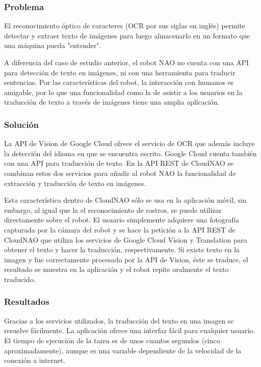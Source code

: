 \subsubsection{Problema}

El reconocimiento óptico de caracteres (OCR por sus siglas en inglés) permite detectar y extraer texto de imágenes para luego
almacenarlo en un formato que una máquina pueda "entender".

A diferencia del caso de estudio anterior, el robot NAO
no cuenta con una API para detección de
texto en imágenes, ni con una herramienta
para traducir sentencias. Por las características
del robot, la interacción con humanos es 
amigable, por lo que una funcionalidad como la de asistir
a los usuarios en la traducción de texto a través
de imágenes tiene una amplia aplicación.

\subsubsection{Solución}


La API de Vision de Google Cloud ofrece el servicio de OCR
que además incluye la detección del idioma en que se encuentra escrito.
Google Cloud cuenta también con una API para traducción de 
texto.
En la API REST de CloudNAO se combinan estos dos servicios
para añadir al robot NAO la funcionalidad de extracción y traducción de texto en imágenes. 

Esta característica dentro de CloudNAO sólo
se usa en la aplicación móvil, sin embargo, al igual que
la el reconocimiento de rostros, se puede utilizar directamente
sobre el robot. El usuario simplemente adquiere una fotografía
capturada por la cámara del robot y se hace la petición
a la API REST de CloudNAO que utiliza los servicios
de Google Cloud Vision y Translation para obtener el texto
y hacer la traducción, respectivamente.
Si existe texto en la imagen y fue correctamente procesado por
la API de Vision, éste se traduce, el resultado se muestra
en la aplicación y el robot repite oralmente
el texto traducido.

\subsubsection{Resultados}

Gracias a los servicios utilizados, la traducción 
del texto en una imagen se resuelve fácilmente.
La aplicación ofrece una interfaz fácil para cualquier
usuario. El tiempo de ejecución de la tarea
es de unos cuantos segundos (cinco aproximadamente), aunque es 
una variable dependiente de la velocidad de la conexión 
a internet.


